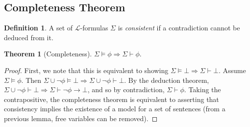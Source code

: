 \documentclass{article}
\theoremstyle{definition}
\newtheorem{thm}{Theorem}[subsection]
\newtheorem{defn}{Definition}[subsection]
\begin{document}
\subsection{Completeness Theorem}
\begin{defn}
	A set of $\mathcal{L}$-formulas $\Sigma$ is \emph{consistent} if a contradiction cannot be deduced from it.
\end{defn}
\begin{thm}[Completeness]
	$\Sigma\models\phi\Rightarrow\Sigma\vdash\phi$.
\end{thm}
\begin{proof}
	First, we note that this is equivalent to showing $\Sigma\models\bot\Rightarrow\Sigma\vdash\bot$. Assume $\Sigma\models\phi$. Then $\Sigma\cup\neg\phi\models\bot\Rightarrow\Sigma\cup\neg\phi\vdash\bot$. By the deduction theorem, $\Sigma\cup\neg\phi\vdash\bot\Rightarrow\Sigma\vdash\neg\phi\rightarrow\bot$, and so by contradiction, $\Sigma\vdash\phi$. Taking the contrapositive, the completeness theorem is equivalent to asserting that consistency implies the existence of a model for a set of sentences (from a previous lemma, free variables can be removed).\par


\end{proof}
\end{document}
